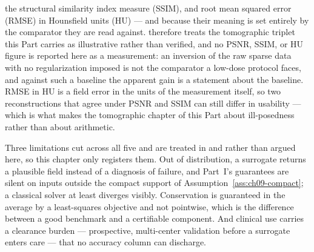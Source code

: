 the structural similarity index measure (SSIM), and root mean squared error (RMSE) in Hounsfield
units (HU)
--- and because their meaning is set entirely by the comparator they are read against.
 therefore treats the tomographic
triplet this Part carries as illustrative rather than verified, and no PSNR,
SSIM, or HU figure is reported here as a measurement: an inversion of the raw sparse data with no
regularization imposed is not the comparator a low-dose protocol faces, and against such a baseline
the apparent gain is a statement about the baseline.
RMSE in HU is a field error in the units of the measurement itself, so two reconstructions that
agree under PSNR and SSIM can still differ in
usability --- which is what makes the tomographic chapter of this
Part about ill-posedness rather than about arithmetic.

Three limitations cut across all five and are treated in
 and
 rather than argued here, so this
chapter only registers them. Out of distribution, a surrogate returns a plausible field instead of
a diagnosis of failure, and Part~I's guarantees are silent on inputs outside the compact support
of Assumption~\ref{ass:ch09-compact}; a classical solver at least diverges
visibly. Conservation is
guaranteed in the average by a least-squares objective and not pointwise, which is the difference
between a good benchmark and a certifiable component.
And clinical use carries a clearance burden --- prospective, multi-center validation before a
surrogate enters care --- that no accuracy column can discharge.


